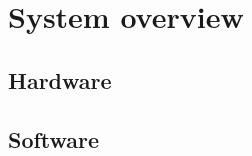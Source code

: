 \graphicspath{{system_overview/fig/}}

\chapter{System overview}
\label{chap:system_overview}

    \section{Hardware}
    \section{Software}


